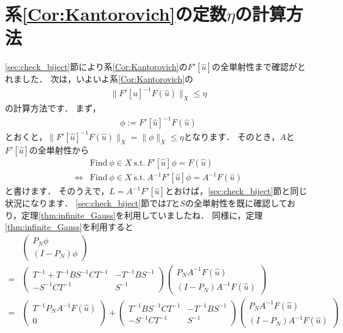 \section{系\ref{Cor:Kantorovich}の定数\texorpdfstring{$\eta$}{eta}の計算方法}\label{sec:general_eta}
\ref{sec:check_biject}節により系\ref{Cor:Kantorovich}の$F'[\hat{u}]$の全単射性まで確認がとれました．
次は，いよいよ系\ref{Cor:Kantorovich}の
\begin{align*}
	\| F'[\hat{u}]^{-1} F(\hat{u}) \|_{X} \le \eta
\end{align*}
の計算方法です．
まず，
\begin{align*}
	\phi := F'[\hat{u}]^{-1} F(\hat{u})
\end{align*}
とおくと，$\| F'[\hat{u}]^{-1} F(\hat{u}) \|_{X} = \| \phi \|_{X}  \le \eta$となります．
そのとき，$A$と$F'[\hat{u}]$の全単射性から
\begin{align*}
	& \mbox{Find} ~ \phi \in X ~ \mbox{s.t.} ~ F'[\hat{u}] \phi = F(\hat{u}) \\
	\Leftrightarrow& \mbox{Find} ~ \phi \in X ~ \mbox{s.t.} ~ A^{-1}F'[\hat{u}] \phi = A^{-1} F(\hat{u})
\end{align*}
と書けます．
そのうえで，$L = A^{-1}F'[\hat{u}]$とおけば，\ref{sec:check_biject}節と同じ状況になります．
\ref{sec:check_biject}節では$T$と$S$の全単射性を既に確認しており，定理\ref{thm:infinite_Gauss}を利用していましたね．
同様に，定理\ref{thm:infinite_Gauss}を利用すると
{\small \begin{align*}
	 &\left( \begin{array}{c}
		P_N \phi \\
		(I - P_N) \phi
	\end{array} \right) \\
	 =& \left( \begin{array}{cc}
		T^{-1} + T^{-1} B S^{-1} C T^{-1} & -T^{-1} B S^{-1} \\
		-S^{-1} C T^{-1} & S^{-1}
	\end{array} \right) \left( \begin{array}{c}
		P_N A^{-1} F( \hat{u} ) \\
		(I-P_N) A^{-1} F( \hat{u} )
	\end{array} \right) \\
	=& \left( \begin{array}{c}
		T^{-1} P_N A^{-1} F( \hat{u} ) \\
		0
	\end{array} \right) + \left( \begin{array}{cc}
		T^{-1} B S^{-1} C T^{-1} & -T^{-1} B S^{-1} \\
		-S^{-1} C T^{-1} & S^{-1}
	\end{array} \right) \left( \begin{array}{c}
		P_N A^{-1} F( \hat{u} ) \\
		(I-P_N) A^{-1} F( \hat{u} )
	\end{array} \right)
\end{align*} }
